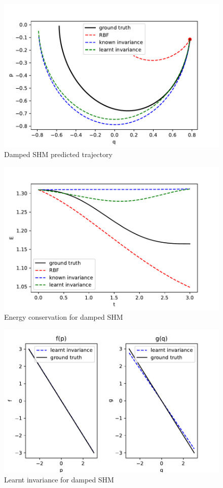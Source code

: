 \documentclass{statsmsc}
\begin{document}
\begin{figure}[H]
        \centering
        \includegraphics[width=0.8\linewidth]{../codes/figures/damped_shm_predicted.pdf}
        \caption{Damped SHM predicted trajectory}
        \label{fig:damped_shm_prediction}
\end{figure}

\begin{figure}[H] 
  \includegraphics[width=0.8\linewidth]{../codes/figures/damped_shm_energy.pdf}
  \centering
  \caption{Energy conservation for damped SHM}
  \label{fig:damped_shm_energy}
\end{figure}


\begin{figure}[H] 
  \includegraphics[width=0.8\linewidth]{../codes/figures/damped_shm_learnt.pdf}
  \centering
  \caption{Learnt invariance for damped SHM}
  \label{fig:damped_shm_learnt}
\end{figure}
\end{document}
